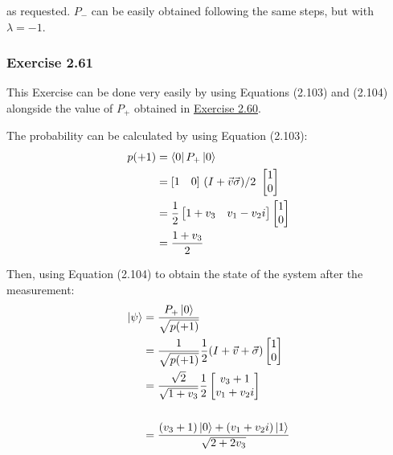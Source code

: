 as requested.
$P_-$ can be easily obtained following the same steps,
but with $\lambda = -1$.

\subsubsection{Exercise 2.61}
This Exercise can be done very easily by using Equations (2.103) and (2.104)
alongside the value of $P_+$ obtained in
\hyperref[sec:nielsen-and-chuang-exercise-2-60]{Exercise 2.60}.

The probability can be calculated by using Equation (2.103):
\begin{align}
    p(+1) &= \bra{0}P_+\ket{0} \\
    &= [ \begin{matrix} 1 & 0 \end{matrix} ]
        \ (I + \vec{v} \vec{\sigma}) / 2
        \ \left[ \begin{matrix} 1 \\ 0 \end{matrix} \right] \\
    &= \frac{1}{2} \left[ \begin{matrix} 1 + v_3 & v_1 - v_2i \end{matrix} \right]
        \left[ \begin{matrix} 1 \\ 0 \end{matrix} \right] \\
    &= \frac{1 + v_3}{2}
\end{align}

Then, using Equation (2.104) to obtain the state of the system
after the measurement:
%
\begin{align}
    \ket{\psi} &= \frac{P_+ \ket{0}}{\sqrt{p(+1)}} \\
    &= \frac{1}{\sqrt{p(+1)}} \frac{1}{2} (I + \vec{v} + \vec{\sigma})
        \left[ \begin{matrix} 1 \\ 0 \end{matrix} \right] \\
    &= \frac{\sqrt{2}}{\sqrt{1 + v_3}} \frac{1}{2}
        \left[ \begin{matrix} v_3 + 1 \\ v_1 + v_2i \end{matrix} \right] \\
    \notag \\
    &= \frac{(v_3 + 1)\ket{0} + (v_1 + v_2i)\ket{1}}{\sqrt{2 + 2v_3}}
\end{align}